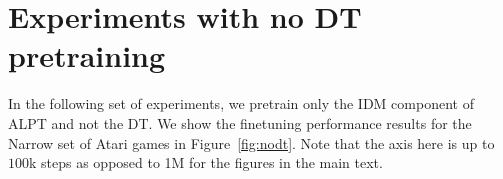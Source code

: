 \documentclass{article} %
\begin{document}
\section{Experiments with no DT pretraining}
\label{app:alpt-no-dt}
In the following set of experiments, we pretrain only the IDM component of ALPT and not the DT.  We show the finetuning performance results for the Narrow set of Atari games in Figure~\ref{fig:nodt}. Note that the axis here is up to $100$k steps as opposed to 1M for the figures in the main text.
\begin{figure}[H]
    \centering
         \\


\end{figure}
\end{document}
